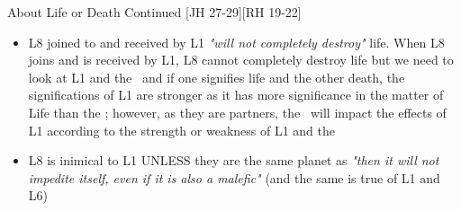 \begin{frame}[t]{About Life or Death Continued [JH 27-29][RH 19-22]}
\begin{itemize}
\item L8 joined to and received by L1 \textsl{"will not completely destroy"} life. When L8 joins and is received by L1, L8 cannot completely destroy life but we need to look at L1 and the \Moon\ and if one signifies life and the other death, the significations of L1 are stronger as it has more significance in the matter of Life than the \Moon; however, as they are partners, the \Moon\ will impact the effects of L1 according to the strength or weakness of L1 and the \Moon

\item L8 is inimical to L1 UNLESS they are the same planet as \textsl{"then it will not impedite itself, even if it is also a malefic"} (and the same is true of L1 and L6)
\end{itemize}

\end{frame}